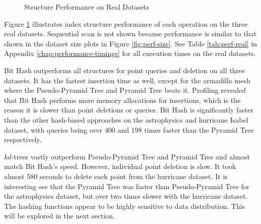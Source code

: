 \begin{figure}
	\caption{Structure Performance on Real Datasets}
	\label{fig:perf-real}
\end{figure}

Figure \ref{fig:perf-real} illustrates index structure performance of each operation on the three real datasets. Sequential scan is not shown because performance is similar to that shown in the dataset size plots in Figure \ref{fig:perf-size}. See Table \ref{tab:perf-real} in Appendix \ref{chap:performance-timings} for all execution times on the real datasets.

Bit Hash outperforms all structures for point queries and deletion on all three datasets. It has the fastest insertion time as well, except for the armadillo mesh where the Pseudo-Pyramid Tree and Pyramid Tree beats it. Profiling revealed that Bit Hash performs more memory allocations for insertions, which is the reason it is slower than point deletions or queries. Bit Hash is significantly faster than the other hash-based approaches on the astrophysics and hurricane Isabel dataset, with queries being over 400 and 198 times faster than the Pyramid Tree respectively.

$kd$-trees vastly outperform Pseudo-Pyramid Tree and Pyramid Tree and almost match Bit Hash's speed. However, individual point deletion is slow. It took almost 580 seconds to delete each point from the hurricane dataset. It is interesting see that the Pyramid Tree was faster than Pseudo-Pyramid Tree for the astrophysics dataset, but over two times slower with the hurricane dataset. The hashing functions appear to be highly sensitive to data distribution. This will be explored in the next section.

